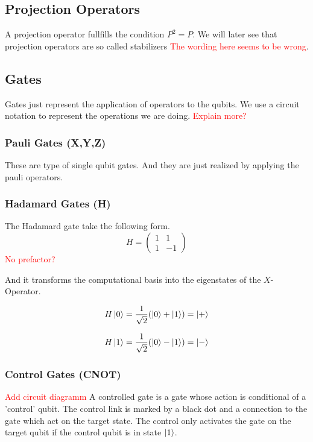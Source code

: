\subsection{Projection Operators}

A projection operator fullfills the condition $P^2=P$.
We will later see that projection operators are so called stabilizers \textcolor{red}{The wording here seems to be wrong}.


\subsection{Gates}
Gates just represent the application of operators to the qubits. 
We use a circuit notation to represent the operations we are doing.
\textcolor{red}{Explain more?}


\subsubsection{Pauli Gates (X,Y,Z)}
These are type of single qubit gates. And they are just realized by applying the pauli operators. 

\subsubsection{Hadamard Gates (H)}
The Hadamard gate take the following form.
\begin{equation}
H=    
\begin{pmatrix}
1 & 1  \\
1 & -1  
\end{pmatrix}
\end{equation}
\textcolor{red}{No prefactor?}

And it transforms the computational basis into the eigenstates of the $X$-Operator.

\begin{equation}
    H\ket{0} = \frac{1}{\sqrt{2}} (\ket{0} + \ket{1}) = \ket{+}
\end{equation}

\begin{equation}
    H\ket{1} = \frac{1}{\sqrt{2}} (\ket{0} - \ket{1}) = \ket{-}
\end{equation}

\subsubsection{Control Gates (CNOT)}

\textcolor{red}{Add circuit diagramm}
A controlled gate is a gate whose action is conditional of a 'control' qubit.
The control link is marked by a black dot and a connection to the gate which act on the target state. 
The control only activates the gate on the target qubit if the control qubit is in state $\ket{1}$.

